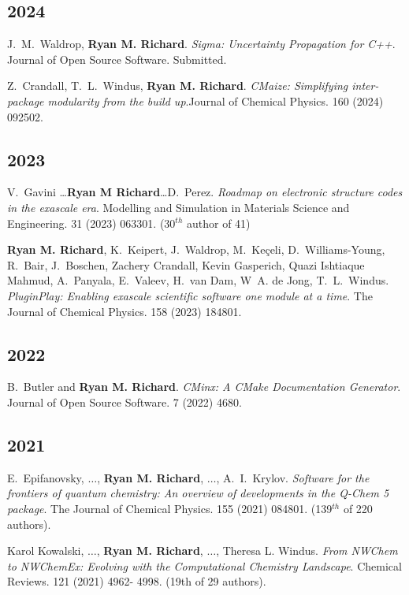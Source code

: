 \documentclass[11pt,a4paper,sans]{moderncv}
\begin{document}
\vspace{5pt}
\begin{etaremune}
\item[]{}
	\subsection{2024}
	\item{J.~M.~Waldrop, \textbf{Ryan M. Richard}. \textit{Sigma: Uncertainty Propagation for C++}. Journal of Open Source Software. Submitted.}
	\item{Z.~Crandall, T.~L.~Windus, \textbf{Ryan M. Richard}. 
	      \textit{CMaize: Simplifying inter-package modularity from the build 
		  up}.Journal of Chemical Physics. 160 (2024) 092502.}

	\subsection{2023}
	\item{V.~Gavini \ldots \textbf{Ryan M Richard}\ldots D.~Perez.
	      \textit{Roadmap on electronic structure codes in the exascale era}.
		  Modelling and Simulation in Materials Science and Engineering. 31
		  (2023) 063301. (30$^{th}$ author of 41)
	}
	\item{\textbf{Ryan M. Richard}, K.~Keipert, J.~Waldrop,
	      M.~Keçeli, D.~Williams-Young, R.~Bair, J.~Boschen,
		  Zachery Crandall, Kevin Gasperich, Quazi Ishtiaque Mahmud,
		  A.~Panyala, E.~Valeev, H.~van Dam, W~A. de Jong,
		  T.~L.~Windus. \textit{PluginPlay: Enabling exascale scientific
		  software one module at a time}. The Journal of Chemical Physics. 158
		  (2023) 184801.
	}

	\subsection{2022}
	\item{B.~Butler and \textbf{Ryan M. Richard}. \textit{CMinx: A CMake
	      Documentation Generator}. Journal of Open Source Software. 7 (2022)
		  4680.
	}

	\subsection{2021}
	\item{E.~Epifanovsky, $\ldots$, \textbf{Ryan M. Richard}, $\ldots$,
	      A.~I.~Krylov. \textit{Software for the frontiers of quantum 
		  chemistry: An overview of developments in the Q-Chem 5 package}. The 
		  Journal of Chemical Physics. 155 (2021) 084801. (139$^{th}$ of 220 
		  authors).}
	\item{Karol Kowalski, $\ldots$, \textbf{Ryan M. Richard}, $\ldots$, Theresa 
	      L. Windus. \textit{From NWChem to NWChemEx: Evolving with the 
		  Computational Chemistry Landscape}. Chemical Reviews. 121 (2021) 4962-
		  4998. (19th of 29 authors).}
	

\end{etaremune}
\end{document}
